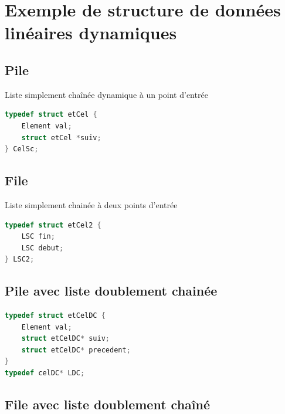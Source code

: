 \section{Exemple de structure de données linéaires dynamiques}
\subsection{Pile}
Liste simplement chaînée dynamique à un point d'entrée

\begin{lstlisting}[language=C, numbers=none,frame=none]
	typedef struct etCel {
	Element val;
	struct etCel *suiv;
} CelSc;
\end{lstlisting}

\subsection{File}
Liste simplement chainée à deux points d'entrée
\begin{lstlisting}[language=C, numbers=none,frame=none]
	typedef struct etCel2 {
	LSC fin;
	LSC debut;
} LSC2;
\end{lstlisting}
\subsection{Pile avec liste doublement chainée}

\begin{lstlisting}[language=C, numbers=none,frame=none]
typedef struct etCelDC {
	Element val;
	struct etCelDC* suiv;
	struct etCelDC* precedent;
}
typedef celDC* LDC;
\end{lstlisting}

\subsection{File avec liste doublement chaîné}
